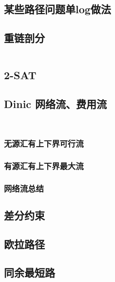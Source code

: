 \documentclass[10pt, a4paper, oneside]{ctexart}
\begin{document}
\begin{multicols}{2}
        \subsection{某些路径问题单log做法}
        
        \subsection{重链剖分}
        \inputminted{cpp}{src/graph/HLD.cpp}
        \subsection{2-SAT}
        
        \subsection{Dinic 网络流、费用流}
        \inputminted{cpp}{src/graph/dinic-flow.cpp}
        \inputminted{cpp}{src/graph/dinic-cost.cpp}
        \subsubsection{无源汇有上下界可行流}
        
        \subsubsection{有源汇有上下界最大流}
        
        \subsubsection{网络流总结}
        \subsection{差分约束}
        
        \subsection{欧拉路径}
        
        \subsection{同余最短路}
        

\end{multicols}
\end{document}
